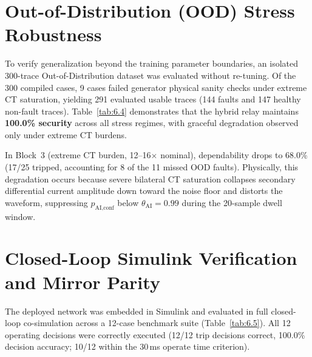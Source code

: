\documentclass[12pt,a4paper,oneside]{report}
\begin{document}


\section{Out-of-Distribution (OOD) Stress Robustness}
To verify generalization beyond the training parameter boundaries, an isolated 300-trace Out-of-Distribution dataset was evaluated without re-tuning. Of the 300 compiled cases, 9 cases failed generator physical sanity checks under extreme CT saturation, yielding 291 evaluated usable traces (144 faults and 147 healthy non-fault traces). Table~\ref{tab:6.4} demonstrates that the hybrid relay maintains \textbf{100.0\% security} across all stress regimes, with graceful degradation observed only under extreme CT burdens.



In Block~3 (extreme CT burden, 12--16$\times$ nominal), dependability drops to 68.0\% (17/25 tripped, accounting for 8 of the 11 missed OOD faults). Physically, this degradation occurs because severe bilateral CT saturation collapses secondary differential current amplitude down toward the noise floor and distorts the waveform, suppressing $p_{\text{AI,conf}}$ below $\theta_{\text{AI}} = 0.99$ during the 20-sample dwell window.

\section{Closed-Loop Simulink Verification and Mirror Parity}
The deployed network was embedded in Simulink and evaluated in full closed-loop co-simulation across a 12-case benchmark suite (Table~\ref{tab:6.5}). All 12 operating decisions were correctly executed (12/12 trip decisions correct, 100.0\% decision accuracy; 10/12 within the 30\,ms operate time criterion).


\end{document}
